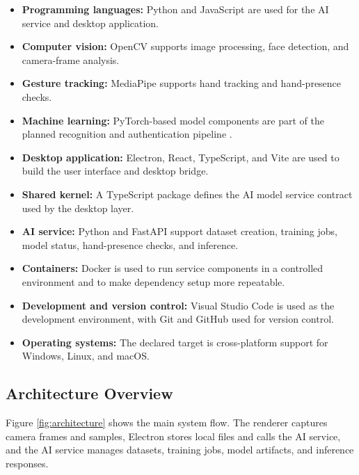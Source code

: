 \documentclass[10pt,twocolumn]{article}
\begin{document}
\begin{itemize}[leftmargin=*]
  \item \textbf{Programming languages:} Python and JavaScript are used for the AI service and desktop application.
  \item \textbf{Computer vision:} OpenCV supports image processing, face detection, and camera-frame analysis.
  \item \textbf{Gesture tracking:} MediaPipe supports hand tracking and hand-presence checks.
  \item \textbf{Machine learning:} PyTorch-based model components are part of the planned recognition and authentication pipeline \cite{paszke2019pytorch}.
  \item \textbf{Desktop application:} Electron, React, TypeScript, and Vite are used to build the user interface and desktop bridge.
  \item \textbf{Shared kernel:} A TypeScript package defines the AI model service contract used by the desktop layer.
  \item \textbf{AI service:} Python and FastAPI support dataset creation, training jobs, model status, hand-presence checks, and inference.
  \item \textbf{Containers:} Docker is used to run service components in a controlled environment and to make dependency setup more repeatable.
  \item \textbf{Development and version control:} Visual Studio Code is used as the development environment, with Git and GitHub used for version control.
  \item \textbf{Operating systems:} The declared target is cross-platform support for Windows, Linux, and macOS.
\end{itemize}

\subsection{Architecture Overview}
Figure \ref{fig:architecture} shows the main system flow.
The renderer captures camera frames and samples, Electron stores local files and calls the AI service, and the AI service manages datasets, training jobs, model artifacts, and inference responses.
\end{document}
